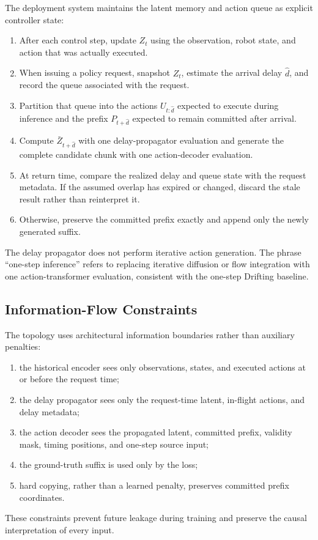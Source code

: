 The deployment system maintains the latent memory and action queue as explicit
controller state:
\begin{enumerate}
    \item After each control step, update \(Z_t\) using the observation, robot
          state, and action that was actually executed.
    \item When issuing a policy request, snapshot \(Z_t\), estimate the arrival
          delay \(\widehat d\), and record the queue associated with the request.
    \item Partition that queue into the actions \(U_{t:\widehat d}\) expected to
          execute during inference and the prefix \(P_{t+\widehat d}\) expected
          to remain committed after arrival.
    \item Compute \(\bar Z_{t+\widehat d}\) with one delay-propagator evaluation
          and generate the complete candidate chunk with one action-decoder
          evaluation.
    \item At return time, compare the realized delay and queue state with the
          request metadata.  If the assumed overlap has expired or changed,
          discard the stale result rather than reinterpret it.
    \item Otherwise, preserve the committed prefix exactly and append only the
          newly generated suffix.
\end{enumerate}

The delay propagator does not perform iterative action generation.  The phrase
``one-step inference'' refers to replacing iterative diffusion or flow
integration with one action-transformer evaluation, consistent with the
one-step Drifting baseline.

\subsection{Information-Flow Constraints}

The topology uses architectural information boundaries rather than auxiliary
penalties:
\begin{enumerate}
    \item the historical encoder sees only observations, states, and executed
          actions at or before the request time;
    \item the delay propagator sees only the request-time latent, in-flight
          actions, and delay metadata;
    \item the action decoder sees the propagated latent, committed prefix,
          validity mask, timing positions, and one-step source input;
    \item the ground-truth suffix is used only by the loss;
    \item hard copying, rather than a learned penalty, preserves committed
          prefix coordinates.
\end{enumerate}
These constraints prevent future leakage during training and preserve the
causal interpretation of every input.

